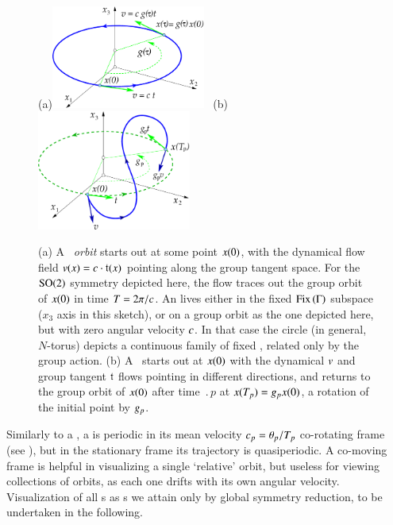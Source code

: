 %
\begin{figure}[ht]
 (a)\includegraphics[width=0.45\textwidth]{../Fig/reqv.eps}
~(b)\includegraphics[width=0.45\textwidth]{../Fig/rpo.eps}
\caption{
(a) A {\em \reqv\ orbit} starts out at some point $x(0)$,
with the dynamical flow field $v(x) = c \cdot
\mathfrak{t}(x)$ pointing along the group tangent space. For
the $\textrm{SO}(2)$ symmetry depicted here, the flow traces out the
group orbit of $x(0)$ in time ${T_{}}=2\pi/c$.
An
{\em \eqv} lives either in the fixed $\mathrm{Fix}\left(\Gamma\right)$ subspace
($x_3$ axis in this sketch), or on a group orbit as the one
depicted here, but with zero angular velocity $c$. In
that case the circle (in general, $N$-torus) depicts a
continuous family of fixed \eqva, related only by the group
action.
(b) A \rpo\ starts out at $x(0)$ with the dynamical $v$ and
group tangent $\mathfrak{t}$ flows pointing in different
directions, and returns to the group orbit of $x(0)$ after
time $\period{p}$ at $x({T_{p}})=g_p x (0)$, a
rotation of the initial point by $g_p$.
}
\label{f:rpo}
\end{figure}

Similarly to a \reqv, a \emph{\rpo} is periodic in its
mean velocity $c_p={\bf \theta}_p/{T_{p}}$ co-rotating
frame (see ), but in the
stationary frame its trajectory is quasiperiodic.
A co-moving
frame is helpful in visualizing a single `relative' orbit,
but useless for viewing collections of orbits, as each one
drifts with its own angular velocity. Visualization of all
\rpo s as \po s we attain only by global symmetry reduction,
to be undertaken in the following.

